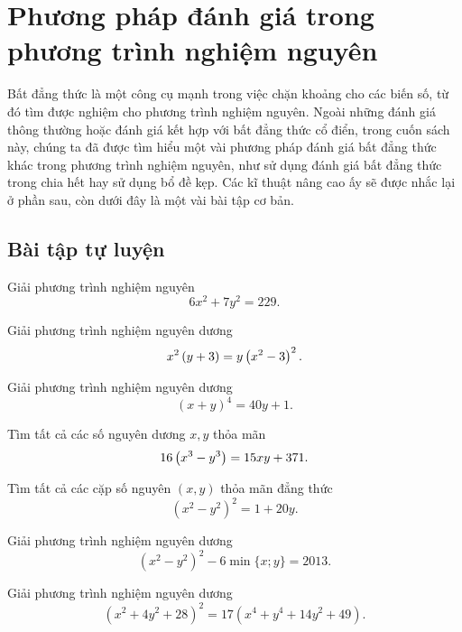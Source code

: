 \section{Phương pháp đánh giá trong phương trình nghiệm nguyên}
Bất đẳng thức là một công cụ mạnh trong việc chặn khoảng cho các biến số, từ đó tìm được nghiệm cho phương trình nghiệm nguyên. Ngoài những đánh giá thông thường hoặc đánh giá kết hợp với bất đẳng thức cổ điển, trong cuốn sách này, chúng ta đã được tìm hiểu một vài phương pháp đánh giá bất đẳng thức khác trong phương trình nghiệm nguyên, như sử dụng đánh giá bất đẳng thức trong chia hết hay sử dụng bổ đề kẹp. Các kĩ thuật nâng cao ấy sẽ được nhắc lại ở phần sau, còn dưới đây là một vài bài tập cơ bản.

\subsection*{Bài tập tự luyện}

\begin{btt}
Giải phương trình nghiệm nguyên $$6x^2+7y^2=229.$$
\end{btt}



\begin{btt}
Giải phương trình nghiệm nguyên dương
\[x^2\left(\displaystyle y+3 \right)=y\left(\displaystyle x^2-3 \right)^2.\]
\end{btt}

\begin{btt}
Giải phương trình nghiệm nguyên dương $$(x+y)^4=40y+1.$$
\end{btt}

\begin{btt}
Tìm tất cả các số nguyên dương $x,y$ thỏa mãn
\[16\left(\displaystyle x^3-y^3 \right)=15xy+371.\]
\end{btt}

\begin{btt}
Tìm tất cả các cặp số nguyên $(x,y)$ thỏa mãn đẳng thức \[\left(x^2-y^2\right)^2=1+20y.\]
\end{btt}

\begin{btt}
Giải phương trình nghiệm nguyên dương
$$\left(x^{2}-y^{2}\right)^{2}-6 \min \{x;y\}=2013.$$
\end{btt}

\begin{btt}
Giải phương trình nghiệm nguyên dương
\[\left(x^2+4 y^2+28\right)^2=17\left(x^4+y^4+14 y^2+49\right).\]
\end{btt}

